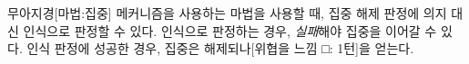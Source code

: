 \documentclass{report}
\begin{document}
	\begin{story}{무아지경}{[마법:집중]}
		 메커니즘을 사용하는 마법을 사용할 때, 집중 해제 판정에 의지 대신 인식으로 판정할 수 있다. 인식으로 판정하는 경우, \emph{실패}해야 집중을 이어갈 수 있다. 인식 판정에 성공한 경우, 집중은 해제되나[위협을 느낌 □: 1턴]을 얻는다.
		
	\end{story}
\end{document}
